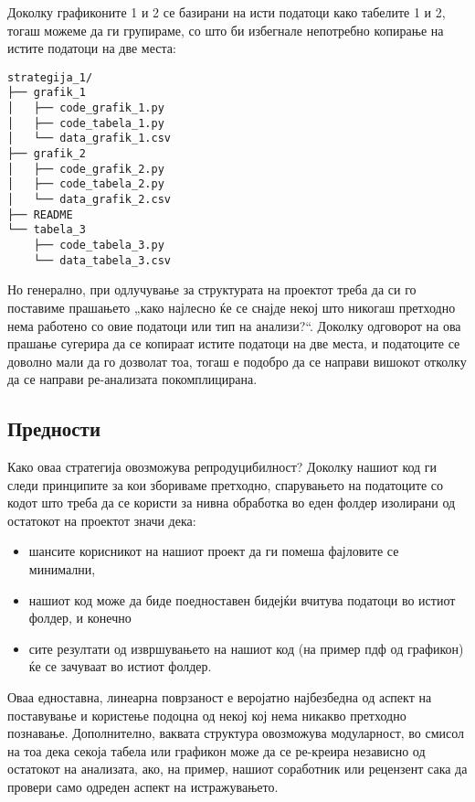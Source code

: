 \documentclass[
]{book}
\providecommand{\tightlist}{%
  \setlength{\itemsep}{0pt}\setlength{\parskip}{0pt}}
\begin{document}
Доколку графиконите 1 и 2 се базирани на исти податоци како табелите 1 и 2, тогаш можеме да ги групираме, со што би избегнале непотребно копирање на истите податоци на две места:

\begin{verbatim}
strategija_1/
├── grafik_1
│   ├── code_grafik_1.py
│   ├── code_tabela_1.py
│   └── data_grafik_1.csv
├── grafik_2
│   ├── code_grafik_2.py
│   ├── code_tabela_2.py
│   └── data_grafik_2.csv
├── README
└── tabela_3
    ├── code_tabela_3.py
    └── data_tabela_3.csv
\end{verbatim}

Но генерално, при одлучување за структурата на проектот треба да си го поставиме прашањето „како најлесно ќе се снајде некој што никогаш претходно нема работено со овие податоци или тип на анализи?{}``. Доколку одговорот на ова прашање сугерира да се копираат истите податоци на две места, и податоците се доволно мали да го дозволат тоа, тогаш е подобро да се направи вишокот отколку да се направи ре-анализата покомплицирана.

\hypertarget{ux43fux440ux435ux434ux43dux43eux441ux442ux438}{%
\subsection{Предности}\label{ux43fux440ux435ux434ux43dux43eux441ux442ux438}}

Како оваа стратегија овозможува репродуцибилност? Доколку нашиот код ги следи принципите за кои збориваме претходно, спарувањето на податоците со кодот што треба да се користи за нивна обработка во еден фолдер изолирани од остатокот на проектот значи дека:

\begin{itemize}
\tightlist
\item
  шансите корисникот на нашиот проект да ги помеша фајловите се минимални,\\
\item
  нашиот код може да биде поедноставен бидејќи вчитува податоци во истиот фолдер, и конечно
\item
  сите резултати од извршувањето на нашиот код (на пример пдф од графикон) ќе се зачуваат во истиот фолдер.
\end{itemize}

Оваа едноставна, линеарна поврзаност е веројатно најбезбедна од аспект на поставување и користење подоцна од некој кој нема никакво претходно познавање. Дополнително, ваквата структура овозможува модуларност, во смисол на тоа дека секоја табела или графикон може да се ре-креира независно од остатокот на анализата, ако, на пример, нашиот соработник или рецензент сака да провери само одреден аспект на истражувањето.
\end{document}
